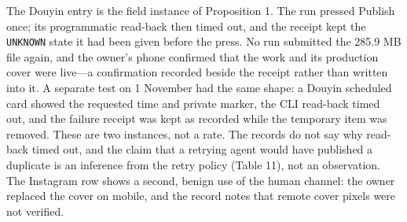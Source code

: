 \documentclass[11pt,a4paper]{article}
\theoremstyle{definition}
\begin{document}
The Douyin entry is the field instance of Proposition 1. The run pressed Publish once; its programmatic read-back then timed out, and the receipt kept the \texttt{UNKNOWN} state it had been given before the press. No run submitted the 285.9 MB file again, and the owner's phone confirmed that the work and its production cover were live---a confirmation recorded beside the receipt rather than written into it. A separate test on 1 November had the same shape: a Douyin scheduled card showed the requested time and private marker, the CLI read-back timed out, and the failure receipt was kept as recorded while the temporary item was removed. These are two instances, not a rate. The records do not say why read-back timed out, and the claim that a retrying agent would have published a duplicate is an inference from the retry policy (Table 11), not an observation. The Instagram row shows a second, benign use of the human channel: the owner replaced the cover on mobile, and the record notes that remote cover pixels were not verified.
\end{document}
